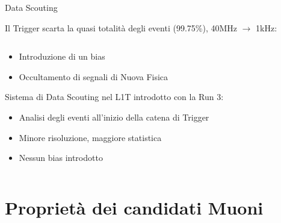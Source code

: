 \documentclass{beamer}
\begin{document}
\begin{frame}{Data Scouting}

Il Trigger scarta la quasi totalità degli eventi (99.75\%), 40MHz $\rightarrow$ 1kHz:


\begin{columns}
    \begin{column}{0.50\textwidth}
        \begin{itemize}            
            \item Introduzione di un bias 
            \item Occultamento di segnali di Nuova Fisica
        \end{itemize}
        \vspace{0.2 cm}
        Sistema di Data Scouting nel L1T introdotto con la Run 3:
        \begin{itemize}
            \item Analisi degli eventi all'inizio della catena di Trigger
            \item Minore risoluzione, maggiore statistica
            \item Nessun bias introdotto

        \end{itemize}
    \end{column}
    \begin{column}{0.5\textwidth}  
    \centering
    \end{column}
\end{columns}
    
\end{frame}




\section{Proprietà dei candidati Muoni}
\end{document}
